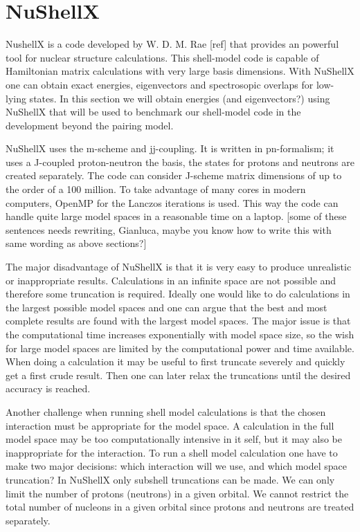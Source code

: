 \documentclass[twoside]{article}
\begin{document}
\section{NuShellX}

NushellX is a code developed by W. D. M. Rae [ref] that provides an powerful tool for nuclear structure calculations. This shell-model code is capable of Hamiltonian matrix calculations with very large basis dimensions. With NuShellX one can obtain exact energies, eigenvectors and spectrosopic overlaps for low-lying states. In this section we will obtain energies (and eigenvectors?) using NuShellX that will be used to benchmark our shell-model code in the development beyond the pairing model. 

NuShellX uses the m-scheme and jj-coupling. It is written in pn-formalism; it uses a J-coupled proton-neutron the basis, the states for protons and neutrons are created separately. The code can consider J-scheme matrix dimensions of up to the order of a 100 million. To take advantage of many cores in modern computers, OpenMP for the Lanczos iterations is used. This way the code can handle quite large model spaces in a reasonable time on a laptop.  [some of these sentences needs rewriting, Gianluca, maybe you know how to write this with same wording as above sections?]

The major disadvantage of NuShellX is that it is very easy to produce unrealistic or inappropriate results. Calculations in an infinite space are not possible and therefore some truncation is required. Ideally one would like to do calculations in the largest possible model spaces and one can argue that the best and most complete results are found with the largest model spaces. The major issue is that the computational time increases exponentially with model space size, so the wish for large model spaces are limited by the computational power and time available. When doing a calculation it may be useful to first truncate severely and quickly get a first crude result. Then one can later relax the truncations until the desired accuracy is reached. 

Another challenge when running shell model calculations is that the chosen interaction must be appropriate for the model space. A calculation in the full model space may be too computationally intensive in it self, but it may also be inappropriate for the interaction. To run a shell model calculation one have to make two major decisions: which interaction will we use, and which model space truncation? In NuShellX only subshell truncations can be made. We can only limit the number of protons (neutrons) in a given orbital. We cannot restrict the total number of nucleons in a given orbital since protons and neutrons are treated separately. 
\end{document}
